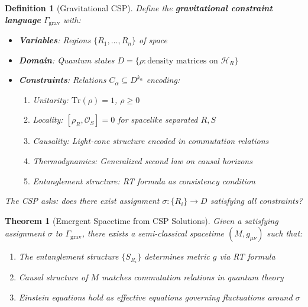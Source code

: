 \documentclass[11pt,a4paper]{article}
\newtheorem{theorem}{Theorem}[section]
\newtheorem{definition}{Definition}[section]
\theoremstyle{remark}
\theoremstyle{definition}
\begin{document}
\begin{definition}[Gravitational CSP]
Define the \textbf{gravitational constraint language} $\Gamma_{\text{grav}}$ with:
\begin{itemize}
\item \textbf{Variables}: Regions $\{R_1, \ldots, R_n\}$ of space
\item \textbf{Domain}: Quantum states $D = \{\rho : \text{density matrices on } \mathcal{H}_R\}$
\item \textbf{Constraints}: Relations $C_\alpha \subseteq D^{k_\alpha}$ encoding:
\begin{enumerate}[label=(\roman*)]
\item Unitarity: $\text{Tr}(\rho) = 1$, $\rho \geq 0$
\item Locality: $[\rho_R, \mathcal{O}_S] = 0$ for spacelike separated $R, S$
\item Causality: Light-cone structure encoded in commutation relations
\item Thermodynamics: Generalized second law on causal horizons
\item Entanglement structure: RT formula as consistency condition
\end{enumerate}
\end{itemize}
The CSP asks: does there exist assignment $\sigma: \{R_i\} \to D$ satisfying all constraints?
\end{definition}

\begin{theorem}[Emergent Spacetime from CSP Solutions]
\label{thm:emergent_spacetime}
Given a satisfying assignment $\sigma$ to $\Gamma_{\text{grav}}$, there exists a semi-classical spacetime $(M, g_{\mu\nu})$ such that:
\begin{enumerate}[label=(\roman*)]
\item The entanglement structure $\{S_{R_i}\}$ determines metric $g$ via RT formula
\item Causal structure of $M$ matches commutation relations in quantum theory
\item Einstein equations hold as effective equations governing fluctuations around $\sigma$
\end{enumerate}
\end{theorem}
\end{document}
